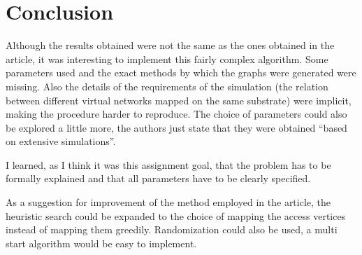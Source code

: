 \documentclass[11pt, a4paper]{article}
\begin{document}
\section{Conclusion}
Although the results obtained were not the same as the ones obtained in the article, it was interesting to implement this fairly complex algorithm. Some parameters used and the exact methods by which the graphs were generated were missing. Also the details of the requirements of the simulation (the relation between different virtual networks mapped on the same substrate) were implicit, making the procedure harder to reproduce. The choice of parameters could also be explored a little more, the authors just state that they were obtained ``based on extensive simulations''.

I learned, as I think it was this assignment goal, that the problem has to be formally explained and that all parameters have to be clearly specified.

As a suggestion for improvement of the method employed in the article, the heuristic search could be expanded to the choice of mapping the access vertices instead of mapping them greedily. Randomization could also be used, a multi start algorithm would be easy to implement.


%

\end{document}
